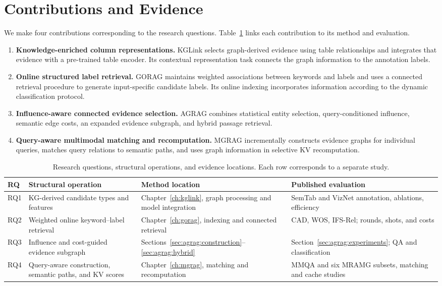 \section{Contributions and Evidence}
\label{sec:introduction:contributions}
We make four contributions corresponding to the research questions. Table~\ref{tab:introduction:questions} links each contribution to its method and evaluation.

\begin{enumerate}
\item \textbf{Knowledge-enriched column representations.} KGLink selects graph-derived evidence using table relationships and integrates that evidence with a pre-trained table encoder. Its contextual representation task connects the graph information to the annotation labels.
\item \textbf{Online structured label retrieval.} GORAG maintains weighted associations between keywords and labels and uses a connected retrieval procedure to generate input-specific candidate labels. Its online indexing incorporates information according to the dynamic classification protocol.
\item \textbf{Influence-aware connected evidence selection.} AGRAG combines statistical entity selection, query-conditioned influence, semantic edge costs, an expanded evidence subgraph, and hybrid passage retrieval.
\item \textbf{Query-aware multimodal matching and recomputation.} MGRAG incrementally constructs evidence graphs for individual queries, matches query relations to semantic paths, and uses graph information in selective KV recomputation.
\end{enumerate}

\begin{table}[!htbp]
\centering\small
\caption{Research questions, structural operations, and evidence locations. Each row corresponds to a separate study.}
\label{tab:introduction:questions}
\begin{tabular}{>{\raggedright\arraybackslash}p{}>{\raggedright\arraybackslash}p{}>{\raggedright\arraybackslash}p{}>{\raggedright\arraybackslash}p{}}
\toprule
RQ & Structural operation & Method location & Published evaluation\\
\midrule
RQ1 & KG-derived candidate types and features & Chapter~\ref{ch:kglink}, graph processing and model integration & SemTab and VizNet annotation, ablations, efficiency\\
RQ2 & Weighted online keyword--label retrieval & Chapter~\ref{ch:gorag}, indexing and connected retrieval & CAD, WOS, IFS-Rel; rounds, shots, and costs\\
RQ3 & Influence and cost-guided evidence subgraph & Sections~\ref{sec:agrag:construction}--\ref{sec:agrag:hybrid} & Section~\ref{sec:agrag:experiments}; QA and classification\\
RQ4 & Query-aware construction, semantic paths, and KV scores & Chapter~\ref{ch:mgrag}, matching and recomputation & MMQA and six MRAMG subsets, matching and cache studies\\
\bottomrule
\end{tabular}
\end{table}

